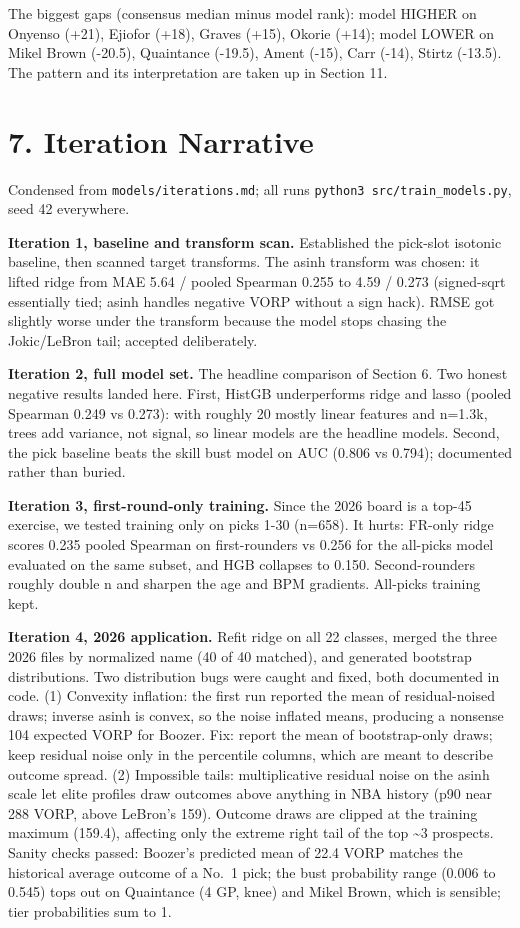 \documentclass[
  10pt,
]{article}
\begin{document}
The biggest gaps (consensus median minus model rank): model HIGHER on Onyenso
(+21), Ejiofor (+18), Graves (+15), Okorie (+14); model LOWER on Mikel Brown
(-20.5), Quaintance (-19.5), Ament (-15), Carr (-14), Stirtz (-13.5). The
pattern and its interpretation are taken up in Section 11.

\section{7. Iteration Narrative}\label{iteration-narrative}

Condensed from \texttt{models/iterations.md}; all runs
\texttt{python3\ src/train\_models.py}, seed 42 everywhere.

\textbf{Iteration 1, baseline and transform scan.} Established the pick-slot
isotonic baseline, then scanned target transforms. The asinh transform was
chosen: it lifted ridge from MAE 5.64 / pooled Spearman 0.255 to 4.59 / 0.273
(signed-sqrt essentially tied; asinh handles negative VORP without a sign hack).
RMSE got slightly worse under the transform because the model stops chasing the
Jokic/LeBron tail; accepted deliberately.

\textbf{Iteration 2, full model set.} The headline comparison of Section 6. Two
honest negative results landed here. First, HistGB underperforms ridge and lasso
(pooled Spearman 0.249 vs 0.273): with roughly 20 mostly linear features and
n=1.3k, trees add variance, not signal, so linear models are the headline
models. Second, the pick baseline beats the skill bust model on AUC (0.806 vs
0.794); documented rather than buried.

\textbf{Iteration 3, first-round-only training.} Since the 2026 board is a
top-45 exercise, we tested training only on picks 1-30 (n=658). It hurts:
FR-only ridge scores 0.235 pooled Spearman on first-rounders vs 0.256 for the
all-picks model evaluated on the same subset, and HGB collapses to 0.150.
Second-rounders roughly double n and sharpen the age and BPM gradients.
All-picks training kept.

\textbf{Iteration 4, 2026 application.} Refit ridge on all 22 classes, merged
the three 2026 files by normalized name (40 of 40 matched), and generated
bootstrap distributions. Two distribution bugs were caught and fixed, both
documented in code. (1) Convexity inflation: the first run reported the mean of
residual-noised draws; inverse asinh is convex, so the noise inflated means,
producing a nonsense 104 expected VORP for Boozer. Fix: report the mean of
bootstrap-only draws; keep residual noise only in the percentile columns, which
are meant to describe outcome spread. (2) Impossible tails: multiplicative
residual noise on the asinh scale let elite profiles draw outcomes above
anything in NBA history (p90 near 288 VORP, above LeBron's 159). Outcome draws
are clipped at the training maximum (159.4), affecting only the extreme right
tail of the top \textasciitilde3 prospects. Sanity checks passed: Boozer's
predicted mean of 22.4 VORP matches the historical average outcome of a No.~1
pick; the bust probability range (0.006 to 0.545) tops out on Quaintance (4 GP,
knee) and Mikel Brown, which is sensible; tier probabilities sum to 1.
\end{document}
